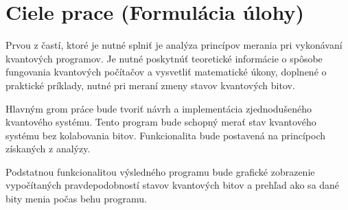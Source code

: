 
\chapter{Ciele prace (Formulácia úlohy)}

Prvou z častí, ktoré je nutné splniť je analýza princípov merania pri 
vykonávaní kvantových programov. Je nutné poskytnúť teoretické informácie
o spôsobe fungovania kvantových počítačov a vysvetliť matematické úkony,
doplnené o praktické príklady, nutné pri meraní zmeny stavov kvantových 
bitov.

Hlavným grom práce bude tvoriť návrh a implementácia zjednodušeného 
kvantového systému. Tento program bude schopný merať stav kvantového systému 
bez kolabovania bitov. Funkcionalita bude postavená na princípoch získaných
z analýzy.

Podstatnou funkcionalitou výsledného programu bude grafické zobrazenie 
vypočítaných pravdepodobností stavov kvantových bitov a prehľad ako sa dané
bity menia počas behu programu.

